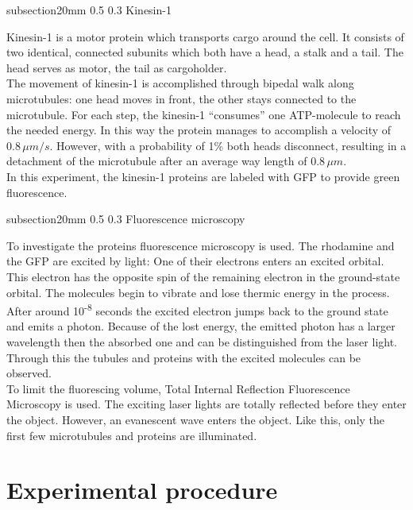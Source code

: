 \documentclass[english, %
parskip=full, %
bibliography=totoc, %
]{scrartcl}
\makeatletter
\renewcommand\subsection{\@startsection 
   {subsection}{2}{0mm}%
   {0.5\baselineskip}%
   {0.3\baselineskip}%
   {\bfseries\sffamily\large}%
   }
\makeatother
\begin{document}
\subsection{Kinesin-1}

Kinesin-1 is a motor protein which transports cargo around the cell. It consists of two identical, connected subunits which both have a head, a stalk and a tail. The head serves as motor, the tail as cargoholder. \\
The movement of kinesin-1 is accomplished through bipedal walk along microtubules: one head moves in front, the other stays connected to the microtubule. For each step, the kinesin-1 “consumes” one ATP-molecule to reach the needed energy. In this way the protein manages to accomplish a velocity of 0.8\,$\mu m/s$. However, with a probability of 1\% both heads disconnect, resulting in a detachment of the microtubule after an average way length of 0.8\,$\mu m$.\\
In this experiment, the kinesin-1 proteins are labeled with GFP to provide green fluorescence.

\subsection{Fluorescence microscopy}

To investigate the proteins fluorescence microscopy is used. The rhodamine and the GFP are excited by light: One of their electrons enters an excited orbital. This electron has the opposite spin of the remaining electron in the ground-state orbital. The molecules begin to vibrate and lose thermic energy in the process. After around 10\textsuperscript{-8} seconds the excited electron jumps back to the ground state and emits a photon. Because of the lost energy, the emitted photon has a larger wavelength then the absorbed one and can be distinguished from the laser light. Through this the tubules and proteins with the excited molecules can be observed.\\
To limit the fluorescing volume, Total Internal Reflection Fluorescence Microscopy is used. The exciting laser lights are totally reflected before they enter the object. However, an evanescent wave enters the object. Like this, only the first few microtubules and proteins are illuminated.

\section{Experimental procedure}
\end{document}
